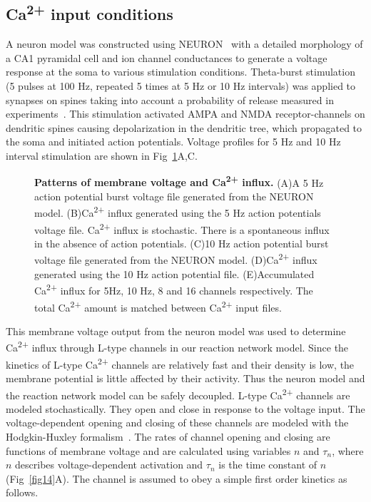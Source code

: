 \documentclass[10pt,letterpaper]{article}
\begin{document}
\subsection*{Ca\textsuperscript{2+} input conditions}

A neuron model was constructed using NEURON~\cite{Carnevale:2006iv} with a detailed morphology of a CA1 pyramidal cell and ion channel conductances to generate a voltage response at the soma to various stimulation conditions. Theta-burst stimulation (5 pulses at 100 Hz, repeated 5 times at 5 Hz or 10 Hz intervals) was applied to synapses on spines taking into account a probability of release measured in experiments~\cite{Grover:2009hb}. This stimulation activated AMPA and NMDA receptor-channels on dendritic spines causing depolarization in the dendritic tree, which propagated to the soma and initiated action potentials. Voltage profiles for 5 Hz and 10 Hz interval stimulation are shown in Fig~\ref{fig13}A,C. 

\begin{figure}[!h]
	\caption{{\bf Patterns of membrane voltage and Ca\textsuperscript{2+} influx. }
	(A)A 5 Hz action potential burst voltage file generated from the NEURON model. 
	(B)Ca\textsuperscript{2+} influx generated using the 5 Hz action potentials voltage file. Ca\textsuperscript{2+} influx is stochastic. There is a spontaneous influx in the absence of action potentials. 
	(C)10 Hz action potential burst voltage file generated from the NEURON model. 
	(D)Ca\textsuperscript{2+} influx generated using the 10 Hz action potential file. 
	(E)Accumulated Ca\textsuperscript{2+} influx for 5Hz, 10 Hz, 8 and 16 channels respectively. The total Ca\textsuperscript{2+} amount is matched between Ca\textsuperscript{2+} input files.
	}
\label{fig13}
\end{figure}

This membrane voltage output from the neuron model was used to determine Ca\textsuperscript{2+} influx through L-type channels in our reaction network model. Since the kinetics of L-type Ca\textsuperscript{2+} channels are relatively fast and their density is low, the membrane potential is little affected by their activity. Thus the neuron model and the reaction network model can be safely decoupled. L-type Ca\textsuperscript{2+} channels are modeled stochastically. They open and close in response to the voltage input. The voltage-dependent opening and closing of these channels are modeled with the Hodgkin-Huxley formalism~\cite{Tuckwell:2012tt}. The rates of channel opening and closing are functions of membrane voltage and are calculated using variables $n$ and $\tau_n$, where $n$ describes voltage-dependent activation and $\tau_n$ is the time constant of $n$ (Fig~\ref{fig14}A). The channel is assumed to obey a simple first order kinetics as follows.
\end{document}
